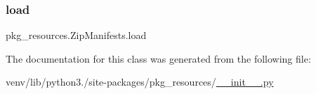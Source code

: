 \subsubsection{\texorpdfstring{load}{load}}
{\footnotesize\ttfamily pkg\+\_\+resources.\+Zip\+Manifests.\+load\hspace{0.3cm}{\ttfamily [static]}}



The documentation for this class was generated from the following file\+:\begin{DoxyCompactItemize}
\item 
venv/lib/python3./site-\/packages/pkg\+\_\+resources/\hyperlink{venv_2lib_2python3_89_2site-packages_2pkg__resources_2____init_____8py}{\+\_\+\+\_\+init\+\_\+\+\_\+.\+py}\end{DoxyCompactItemize}
